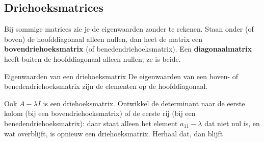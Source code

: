 \begin{oefeningen}
\end{oefeningen}

\subsection{Driehoeksmatrices}

Bij sommige matrices zie je de eigenwaarden zonder te rekenen. Staan onder (of boven) de hoofddiagonaal alleen nullen, dan heet de matrix een \textbf{bovendriehoeksmatrix} (of benedendriehoeksmatrix). Een \textbf{diagonaalmatrix} heeft buiten de hoofddiagonaal alleen nullen; ze is beide.

\begin{theorie}
\begin{stelling}{Eigenwaarden van een driehoeksmatrix}
De eigenwaarden van een boven- of benedendriehoeksmatrix zijn de elementen op de hoofddiagonaal.
\end{stelling}

\begin{bewijs}
Ook $A - \lambda I$ is een driehoeksmatrix. Ontwikkel de determinant naar de eerste kolom (bij een bovendriehoeksmatrix) of de eerste rij (bij een benedendriehoeksmatrix): daar staat alleen het element $a_{11} - \lambda$ dat niet nul is, en wat overblijft, is opnieuw een driehoeksmatrix. Herhaal dat, dan blijft
\end{bewijs}
\end{theorie}


